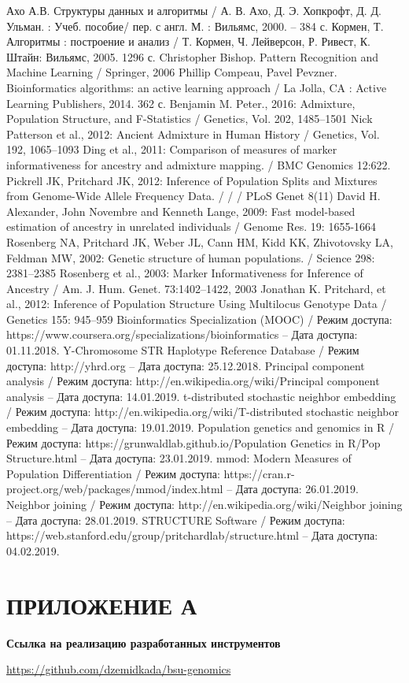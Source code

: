 \renewcommand{\bibname}{Список использованной литературы}
\begin{thebibliography}{9}

Ахо А.В. Структуры данных и алгоритмы
/ А. В. Ахо, Д. Э. Хопкрофт, Д. Д. Ульман. : Учеб. пособие/ пер. с англ. М. : Вильямс, 2000. – 384 с.
Кормен, Т. Алгоритмы : построение и анализ
/ Т. Кормен, Ч. Лейверсон, Р. Ривест, К. Штайн: Вильямс, 2005. 1296 с.
Christopher Bishop. Pattern Recognition and Machine Learning
/ Springer, 2006
Phillip Compeau, Pavel Pevzner. Bioinformatics algorithms: an active learning approach
/ La Jolla, CA : Active Learning Publishers, 2014. 362 с.
Benjamin M. Peter., 2016: Admixture, Population Structure, and F-Statistics
/ Genetics, Vol. 202, 1485–1501
Nick Patterson et al., 2012: Ancient Admixture in Human History
/ Genetics, Vol. 192, 1065–1093
Ding et al., 2011: Comparison of measures of marker informativeness for ancestry and admixture mapping.
/  BMC Genomics 12:622.
Pickrell JK, Pritchard JK, 2012: Inference of Population Splits and Mixtures from Genome-Wide Allele Frequency Data. / / / PLoS Genet 8(11)
David H. Alexander, John Novembre and Kenneth Lange, 2009: Fast model-based estimation of ancestry in unrelated individuals
/ Genome Res. 19: 1655-1664
Rosenberg NA, Pritchard JK, Weber JL, Cann HM, Kidd KK, Zhivotovsky LA, Feldman MW, 2002: Genetic structure of
human populations.
/ Science 298: 2381–2385
Rosenberg et al., 2003: Marker Informativeness for Inference of Ancestry
/ Am. J. Hum. Genet. 73:1402–1422, 2003
Jonathan K. Pritchard, et al., 2012: Inference of Population Structure Using Multilocus Genotype Data
/ Genetics 155: 945–959
Bioinformatics Specialization (MOOC) /
Режим доступа: https://www.coursera.org/specializations/bioinformatics – Дата доступа: 01.11.2018.
Y-Chromosome STR Haplotype Reference Database /
Режим доступа: http://yhrd.org – Дата доступа: 25.12.2018.
Principal component analysis /
Режим доступа: http://en.wikipedia.org/wiki/Principal component analysis – Дата доступа: 14.01.2019.
t-distributed stochastic neighbor embedding /
Режим доступа: http://en.wikipedia.org/wiki/T-distributed stochastic neighbor embedding – Дата доступа: 19.01.2019.
Population genetics and genomics in R /
Режим доступа: https://grunwaldlab.github.io/Population Genetics in R/Pop Structure.html – Дата доступа: 23.01.2019.
mmod: Modern Measures of Population Differentiation /
Режим доступа: https://cran.r-project.org/web/packages/mmod/index.html – Дата доступа: 26.01.2019.
Neighbor joining /
Режим доступа: http://en.wikipedia.org/wiki/Neighbor joining – Дата доступа: 28.01.2019.
STRUCTURE Software /
Режим доступа: https://web.stanford.edu/group/pritchardlab/structure.html – Дата доступа: 04.02.2019.
\end{thebibliography}

\chapter*{ПРИЛОЖЕНИЕ А}

\textbf{Ссылка на реализацию разработанных инструментов}

\href{https://github.com/dzemidkada/bsu-genomics}{https://github.com/dzemidkada/bsu-genomics}

